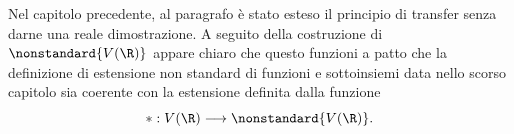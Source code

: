 
Nel capitolo precedente, al paragrafo  è stato esteso il principio di transfer senza darne una reale dimostrazione. A seguito della costruzione di $ \nonstandard{V(\R)} $ appare chiaro che questo funzioni a patto che la definizione di estensione non standard di funzioni e sottoinsiemi data nello scorso capitolo sia coerente con la estensione definita dalla funzione \begin{equation*}
    *: V(\R) \longrightarrow \nonstandard{V(\R)}.
\end{equation*}


